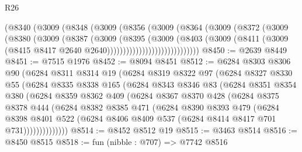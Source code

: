 \begin{lexlean}{R26}
\begin{coremodule}
                    (@8340
                      (@3009
                        (@8348
                          (@3009
                            (@8356
                              (@3009
                                (@8364
                                  (@3009
                                    (@8372
                                      (@3009
                                        (@8380
                                          (@3009
                                            (@8387
                                              (@3009
                                                (@8395
                                                  (@3009
                                                    (@8403
                                                      (@3009
                                                        (@8411
                                                          (@3009
                                                            (@8415
                                                              @8417
                                                              @2640
                                                              @2640)))))))))))))))))))))))))))))
@8450 := @2639 @8449
@8451 := @7515 @1976
@8452 := @8094 @8451
@8512 := @6284
    @8303
    @8306
    @90
    (@6284
      @8311
      @8314
      @19
      (@6284
        @8319
        @8322
        @97
        (@6284
          @8327
          @8330
          @55
          (@6284
            @8335
            @8338
            @165
            (@6284
              @8343
              @8346
              @83
              (@6284
                @8351
                @8354
                @380
                (@6284
                  @8359
                  @8362
                  @409
                  (@6284
                    @8367
                    @8370
                    @428
                    (@6284
                      @8375
                      @8378
                      @444
                      (@6284
                        @8382
                        @8385
                        @471
                        (@6284
                          @8390
                          @8393
                          @479
                          (@6284
                            @8398
                            @8401
                            @522
                            (@6284 @8406 @8409 @537 (@6284 @8414 @8417 @701 @731))))))))))))))
@8514 := @8452 @8512 @19
@8515 := @3463 @8514
@8516 := @8450 @8515
@8518 := fun (nibble : @707) => @7742 @8516

\end{coremodule}
\end{lexlean}
